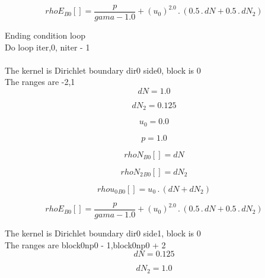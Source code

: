 \documentclass{article}
\begin{document}
\begin{dmath}{rhoE{_{B0}}}[{}] = \frac{p}{gama - 1.0} + \left(u_{0} \right)^{2.0} \,.\, \left(0.5 \,.\, dN + 0.5 \,.\, dN_{2}\right)\end{dmath}

\noindent Ending condition loop %
\\\noindent Do loop iter,0, niter - 1\\
\\\noindent The kernel is Dirichlet boundary dir0 side0, block is 0\\\noindent The ranges are -2,1\\\begin{dmath}dN = 1.0\end{dmath}

\begin{dmath}dN_{2} = 0.125\end{dmath}

\begin{dmath}u_{0} = 0.0\end{dmath}

\begin{dmath}p = 1.0\end{dmath}

\begin{dmath}{rhoN{_{B0}}}[{}] = dN\end{dmath}

\begin{dmath}{rhoN_{2}{_{B0}}}[{}] = dN_{2}\end{dmath}

\begin{dmath}{rhou_{0}{_{B0}}}[{}] = u_{0} \,.\, \left(dN + dN_{2}\right)\end{dmath}

\begin{dmath}{rhoE{_{B0}}}[{}] = \frac{p}{gama - 1.0} + \left(u_{0} \right)^{2.0} \,.\, \left(0.5 \,.\, dN + 0.5 \,.\, dN_{2}\right)\end{dmath}

\noindent The kernel is Dirichlet boundary dir0 side1, block is 0\\\noindent The ranges are block0np0 - 1,block0np0 + 2\\\begin{dmath}dN = 0.125\end{dmath}

\begin{dmath}dN_{2} = 1.0\end{dmath}
\end{document}
